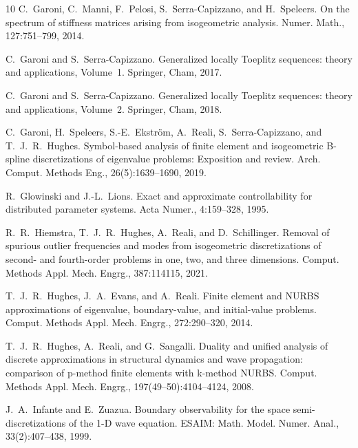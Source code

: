 \documentclass[11pt]{article}
\begin{document}
\begin{thebibliography}{10}
C.~Garoni, C.~Manni, F.~Pelosi, S.~Serra-Capizzano, and H.~Speleers.
\newblock On the spectrum of stiffness matrices arising from isogeometric analysis.
\newblock Numer. Math., 127:751--799, 2014.

C.~Garoni and S.~Serra-Capizzano.
\newblock Generalized locally Toeplitz sequences: theory and applications, Volume~1.
\newblock Springer, Cham, 2017.



C.~Garoni and S.~Serra-Capizzano.
\newblock Generalized locally Toeplitz sequences: theory and applications, Volume~2.
\newblock Springer, Cham, 2018.


C.~Garoni, H.~Speleers, S.-E.~Ekstr{\"o}m, A.~Reali, S.~Serra-Capizzano, and T.~J.~R.~Hughes.
\newblock Symbol-based analysis of finite element and isogeometric B-spline discretizations of eigenvalue problems: Exposition and review.
\newblock Arch. Comput. Methods Eng., 26(5):1639--1690, 2019.



R.~Glowinski and J.-L.~Lions.
\newblock Exact and approximate controllability for distributed parameter systems.
\newblock Acta Numer., 4:159--328, 1995.


R.~R.~Hiemstra, T.~J.~R.~Hughes, A.~Reali, and D.~Schillinger.
\newblock Removal of spurious outlier frequencies and modes from isogeometric discretizations of second- and fourth-order problems in one, two, and three dimensions.
\newblock Comput. Methods Appl. Mech. Engrg., 387:114115, 2021.


T.~J.~R.~Hughes, J.~A.~Evans, and A.~Reali.
\newblock Finite element and {NURBS} approximations of eigenvalue, boundary-value, and initial-value problems.
\newblock Comput. Methods Appl. Mech. Engrg., 272:290--320, 2014.



T.~J.~R.~Hughes, A.~Reali, and G.~Sangalli.
\newblock Duality and unified analysis of discrete approximations in structural dynamics and wave propagation: comparison of p-method finite elements with k-method {NURBS}.
\newblock Comput. Methods Appl. Mech. Engrg., 197(49--50):4104--4124, 2008.


J.~A.~Infante and E.~Zuazua.
\newblock Boundary observability for the space semi-discretizations of the 1-D wave equation.
\newblock ESAIM: Math. Model. Numer. Anal., 33(2):407--438, 1999.




\end{thebibliography}
\end{document}
